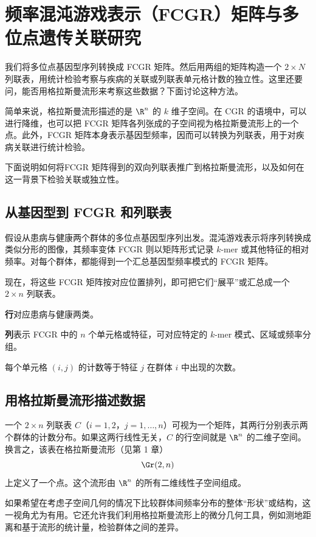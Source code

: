 \section{频率混沌游戏表示（FCGR）矩阵与多位点遗传关联研究}

我们将多位点基因型序列转换成 FCGR 矩阵。然后用两组的矩阵构造一个 $2\times N$ 列联表，用统计检验考察与疾病的关联或列联表单元格计数的独立性。这里还要问，能否用格拉斯曼流形来考察这些数据？下面讨论这种方法。

简单来说，格拉斯曼流形描述的是 $\R^n$ 的 $k$ 维子空间。在 CGR 的语境中，可以进行降维，也可以把 FCGR 矩阵各列张成的子空间视为格拉斯曼流形上的一个点。此外，FCGR 矩阵本身表示基因型频率，因而可以转换为列联表，用于对疾病关联进行统计检验。

下面说明如何将FCGR 矩阵得到的双向列联表推广到格拉斯曼流形，以及如何在这一背景下检验关联或独立性。

\subsection{从基因型到 FCGR 和列联表}

假设从患病与健康两个群体的多位点基因型序列出发。混沌游戏表示将序列转换成类似分形的图像，其频率变体 FCGR 则以矩阵形式记录 $k$-mer 或其他特征的相对频率。对每个群体，都能得到一个汇总基因型频率模式的 FCGR 矩阵。

现在，将这些 FCGR 矩阵按对应位置排列，即可把它们“展平”或汇总成一个 $2\times n$ 列联表。

\textbf{行}\quad 对应患病与健康两类。

\textbf{列}\quad 表示 FCGR 中的 $n$ 个单元格或特征，可对应特定的 $k$-mer 模式、区域或频率分组。

每个单元格 $(i,j)$ 的计数等于特征 $j$ 在群体 $i$ 中出现的次数。

\subsection{用格拉斯曼流形描述数据}

一个 $2\times n$ 列联表 $C$（$i=1,2$，$j=1,\ldots,n$）可视为一个矩阵，其两行分别表示两个群体的计数分布。如果这两行线性无关，$C$ 的行空间就是 $\R^n$ 的二维子空间。换言之，该表在格拉斯曼流形（见第 1 章）
\[
  \Gr(2,n)
\]
上定义了一个点。这个流形由 $\R^n$ 的所有二维线性子空间组成。

如果希望在考虑子空间几何的情况下比较群体间频率分布的整体“形状”或结构，这一视角尤为有用。它还允许我们利用格拉斯曼流形上的微分几何工具，例如测地距离和基于流形的统计量，检验群体之间的差异。

